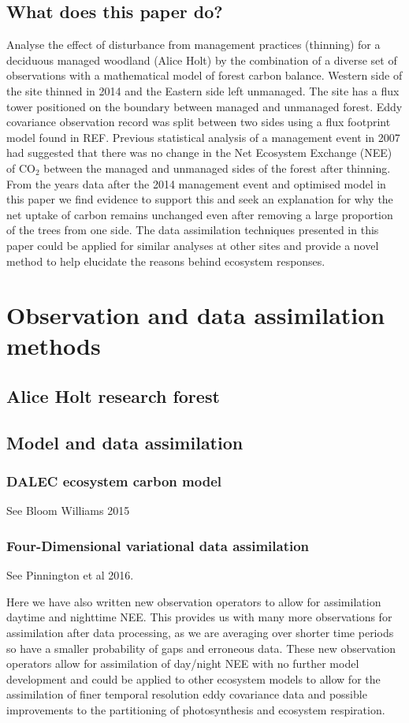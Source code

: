 \documentclass[11pt]{article}
\begin{document}
\subsection{What does this paper do?}
Analyse the effect of disturbance from management practices (thinning) for a deciduous managed woodland (Alice Holt) by the combination of a diverse set of observations with a mathematical model of forest carbon balance. Western side of the site thinned in 2014 and the Eastern side left unmanaged. The site has a flux tower positioned on the boundary between managed and unmanaged forest. Eddy covariance observation record was split between two sides using a flux footprint model found in REF. Previous statistical analysis of a management event in 2007 had suggested that there was no change in the Net Ecosystem Exchange (NEE) of CO\(_{2}\) between the managed and unmanaged sides of the forest after thinning. From the years data after the 2014 management event and optimised model in this paper we find evidence to support this and seek an explanation for why the net uptake of carbon remains unchanged even after removing a large proportion of the trees from one side. The data assimilation techniques presented in this paper could be applied for similar analyses at other sites and provide a novel method to help elucidate the reasons behind ecosystem responses.   

\section{Observation and data assimilation methods}
\subsection{Alice Holt research forest}

\subsection{Model and data assimilation}
\subsubsection{DALEC ecosystem carbon model}
See Bloom Williams 2015
\subsubsection{Four-Dimensional variational data assimilation}
See Pinnington et al 2016.

Here we have also written new observation operators to allow for assimilation daytime and nighttime NEE. This provides us with many more observations for assimilation after data processing, as we are averaging over shorter time periods so have a smaller probability of gaps and erroneous data. These new observation operators allow for assimilation of day/night NEE with no further model development and could be applied to other ecosystem models to allow for the assimilation of finer temporal resolution eddy covariance data and possible improvements to the partitioning of photosynthesis and ecosystem respiration. 
\end{document}
